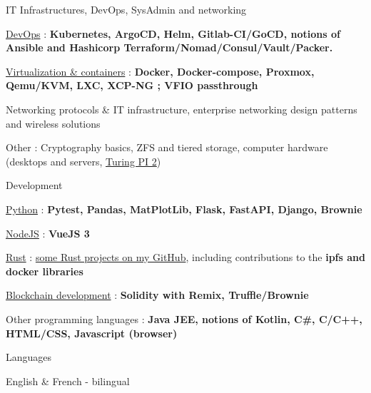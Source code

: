 \begin{cventries}

  \cventry
    {} %
    {IT Infrastructures, DevOps, SysAdmin and networking} %
    {} %
    {} %
    {
      \begin{cvitems} %
        \item {\underline{DevOps} : \textbf{Kubernetes, ArgoCD, Helm, Gitlab-CI/GoCD, notions of Ansible and Hashicorp Terraform/Nomad/Consul/Vault/Packer.}}
        \item {\underline{Virtualization \& containers} : \textbf{Docker, Docker-compose, Proxmox, Qemu/KVM, LXC, XCP-NG ; VFIO passthrough}}
        \item {Networking protocols \& IT infrastructure, enterprise networking design patterns and wireless solutions}
        \item {Other : Cryptography basics, ZFS and tiered storage, computer hardware (desktops and servers, \href{https://turingpi.com/}{Turing PI 2})\\}
      \end{cvitems}
    }
  \cventry
    {} %
    {Development} %
    {} %
    {} %
    {
      \begin{cvitems} %
        \item {\underline{Python} : \textbf{Pytest, Pandas, MatPlotLib, Flask, FastAPI, Django, Brownie}}
        \item {\underline{NodeJS} : \textbf{VueJS 3}}
        \item {\underline{Rust} : \href{https://github.com/guillheu?tab=repositories&q=&type=&language=rust&sort=}{some Rust projects on my GitHub}, including contributions to the \textbf{ipfs and docker libraries}}
        \item {\underline{Blockchain development} : \textbf{Solidity with Remix, Truffle/Brownie}}
        \item {Other programming languages : \textbf{Java JEE, notions of Kotlin, C\#, C/C++, HTML/CSS, Javascript (browser)}\\}
      \end{cvitems}
    }
  \cventry
    {} %
    {Languages} %
    {} %
    {} %
    {
      \begin{cvitems} %
        \item {English \& French - bilingual}
      \end{cvitems}
    }
\end{cventries}